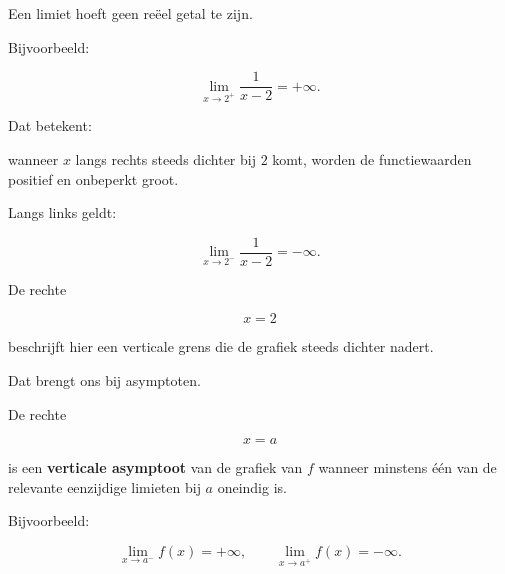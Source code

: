 \documentclass{ximera}
\begin{document}

Een limiet hoeft geen reëel getal te zijn.

Bijvoorbeeld:

\[
\lim_{x\to2^+}\frac{1}{x-2}=+\infty.
\]

Dat betekent:

wanneer $x$ langs rechts steeds dichter bij $2$ komt, worden de
functiewaarden positief en onbeperkt groot.

Langs links geldt:

\[
\lim_{x\to2^-}\frac{1}{x-2}=-\infty.
\]



\begin{center}
\end{center}

De rechte

\[
x=2
\]

beschrijft hier een verticale grens die de grafiek steeds dichter
nadert.

Dat brengt ons bij asymptoten.




\begin{definitie}

De rechte

\[
\boxed{x=a}
\]

is een \textbf{verticale asymptoot} van de grafiek van $f$ wanneer
minstens één van de relevante eenzijdige limieten bij $a$ oneindig
is.

Bijvoorbeeld:

\[
\lim_{x\to a^-}f(x)=+\infty,
\qquad
\lim_{x\to a^+}f(x)=-\infty.
\]

\end{definitie}
\end{document}
